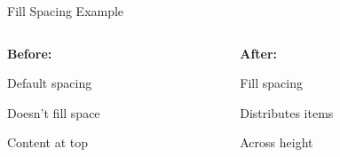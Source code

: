 \documentclass[11pt,compress,t,notes=noshow, xcolor=table]{beamer}
\begin{document}
\begin{frame}{Fill Spacing Example}
  \begin{columns}[T]
    \begin{column}{0.48\textwidth}
      \textbf{Before:}
      \begin{minipage}[t][0.4\textheight][t]{\textwidth}
        \begin{itemizeM}
          \item Default spacing
          \item Doesn't fill space
          \item Content at top
        \end{itemizeM}
      \end{minipage}
    \end{column}
    
    \begin{column}{0.48\textwidth}
      \textbf{After:}
      \begin{minipage}[t][0.4\textheight][t]{\textwidth}
        \begin{itemizeF}
          \item Fill spacing
          \item Distributes items
          \item Across height
        \end{itemizeF}
      \end{minipage}
    \end{column}
  \end{columns}
\end{frame}

\end{document}
